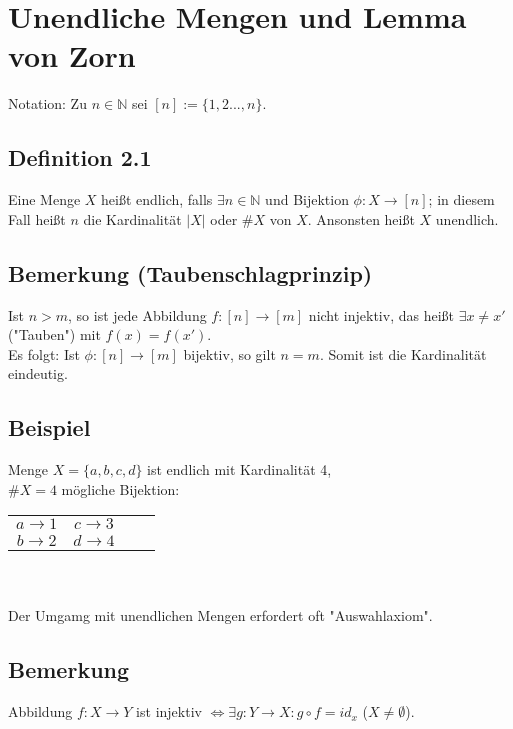 \documentclass {article}
\begin{document}
\section{Unendliche Mengen und Lemma von Zorn}
Notation: Zu $n\in\mathbb{N}$ sei $[n]:= \{1,2...,n\} $.
\subsection{Definition 2.1}
Eine Menge $X$ heißt endlich, falls $\exists n \in \mathbb{N}$ und Bijektion $\phi: X \rightarrow [n]$; in diesem Fall heißt $n$ die Kardinalität $|X|$ oder $\#X$ von $X$.
Ansonsten heißt $X$ unendlich. 
\subsection*{Bemerkung (Taubenschlagprinzip)}
Ist $n>m$, so ist jede Abbildung $f: [n] \rightarrow [m]$ nicht injektiv, das heißt $\exists x\neq x'$ ("Tauben") mit $f(x) = f(x')$. \\
Es folgt: Ist $\phi : [n] \rightarrow [m]$ bijektiv, so gilt $n=m$. Somit ist die Kardinalität eindeutig.
\subsection*{Beispiel}
Menge $X = \{a,b,c,d\}$ ist endlich mit Kardinalität 4, \\
$\#X =  4$ mögliche Bijektion: 
\begin{tabular}{cccc}
$a \rightarrow 1$ & $c \rightarrow 3$ \\
$b \rightarrow 2$ & $d \rightarrow 4$ \\
\end{tabular}
\\
\\
Der Umgamg mit unendlichen Mengen erfordert oft "Auswahlaxiom".
\subsection*{Bemerkung}
Abbildung $f: X \rightarrow Y$ ist injektiv $\Leftrightarrow \exists g: Y \rightarrow X : g \circ f = id_x$ ($X \neq \emptyset $).
\end{document}
